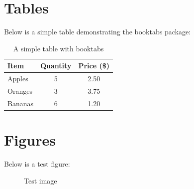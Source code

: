 \documentclass[12pt,a4paper]{article}
\begin{document}
    \clearpage %
    \section{Tables}

    Below is a simple table demonstrating the booktabs package:

    \begin{table}[!ht]
        \centering
        \caption{A simple table with booktabs}
        \begin{tabular}{lcc}
            \toprule
            \textbf{Item} & \textbf{Quantity} & \textbf{Price (\$)} \\
            \midrule
            Apples & 5 & 2.50 \\
            Oranges & 3 & 3.75 \\
            Bananas & 6 & 1.20 \\
            \bottomrule
        \end{tabular}
        \label{tab:simple}
    \end{table}

    \section{Figures}

    Below is a test figure:

    \begin{figure}[!ht]
        \centering
        \caption{Test image}
        \label{fig:test}
    \end{figure}
\end{document}
